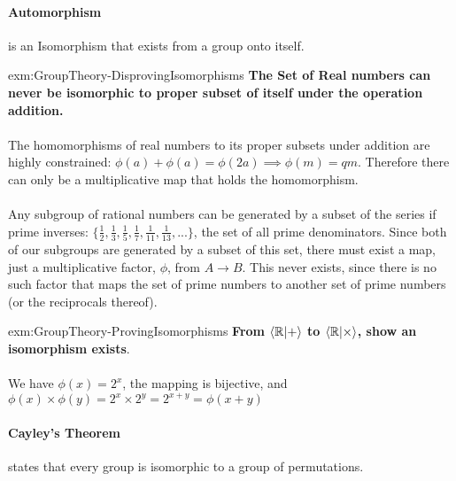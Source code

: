 \paragraph{Automorphism} is an Isomorphism that exists from a group onto itself. \\
\vspace{10px}
\begin{example}{exm:GroupTheory-DisprovingIsomorphisms}
    \textbf{The Set of Real numbers can never be isomorphic to proper subset of itself under the operation addition.}
    \paragraph{} The homomorphisms of real numbers to its proper subsets under addition are highly constrained: $ \phi(a) + \phi(a) = \phi(2a) \implies \phi(m) = qm $. Therefore there can only be a multiplicative map that holds the homomorphism.
    \paragraph{} Any subgroup of rational numbers can be generated by a subset of the series if prime inverses: $\{\frac{1}{2},\frac{1}{3},\frac{1}{5},\frac{1}{7},\frac{1}{11},\frac{1}{13},...\}$, the set of all prime denominators. Since both of our subgroups are generated by a subset of this set, there must exist a map, just a multiplicative factor, $\phi$, from $A \rightarrow B$.
    This never exists, since there is no such factor that maps the set of prime numbers to another set of prime numbers (or the reciprocals thereof).
\end{example}
\vspace{10px}
\begin{example}{exm:GroupTheory-ProvingIsomorphisms}
    \textbf{From $\braket{\mathbb{R} | +}$ to $\braket{\mathbb{R} | \times}$, show an isomorphism exists}.
    \paragraph{} We have $\phi(x) = 2^x$, the mapping is bijective, and $\phi(x) \times \phi(y) = 2^x \times 2^y = 2^{x+y} = \phi(x+y)$
\end{example}

\paragraph{Cayley's Theorem} states that every group is isomorphic to a group of permutations.


